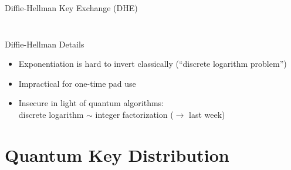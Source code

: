\documentclass{beamer}
\begin{document}
\begin{frame}{Diffie-Hellman Key Exchange (DHE)}
\begin{columns}
\begin{column}{\textwidth}
\begin{figure}
{}
				\end{figure}
			\end{column}
		\end{columns}
	\end{frame}
	
	\begin{frame}{Diffie-Hellman Details} %
		\begin{itemize}

			\item Exponentiation is hard to invert classically
			(\enquote{discrete logarithm problem})

			\item<2-> Impractical for one-time pad use
			\item<3-> Insecure in light of quantum algorithms: \\
			discrete logarithm $\sim$ integer factorization ($\rightarrow$ last
			week)
		\end{itemize}
	\end{frame}




	\section{Quantum Key Distribution}
\end{document}
